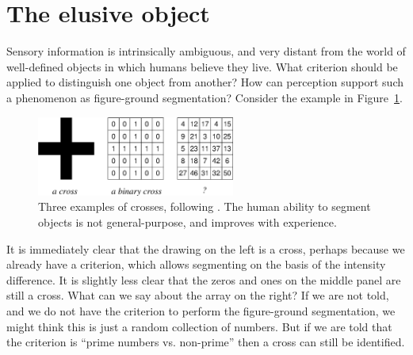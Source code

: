 






\section{The elusive object}

Sensory information is intrinsically ambiguous, and very distant from
the world of well-defined objects in which humans believe they live.
What criterion should be applied to distinguish one object from
another?  How can perception support such a phenomenon as
figure-ground segmentation?  Consider the example in
Figure~\ref{fig:number-cross}.
%
\begin{figure}[tbh]
\begin{center}
\includegraphics[width=6.5cm]{number-cross.eps}
\caption{ 
\label{fig:number-cross}
%
Three examples of crosses, following \cite{manzotti01coscienza}.  The
human ability to segment objects is not general-purpose, and improves
with experience.
%
}
\end{center}
\end{figure}
%
It is immediately clear that the drawing on the left is a cross,
perhaps because we already have a criterion, which allows segmenting
on the basis of the intensity difference. It is slightly less clear
that the zeros and ones on the middle panel are still a cross. What
can we say about the array on the right?  If we are not told, and we
do not have the criterion to perform the figure-ground segmentation,
we might think this is just a random collection of numbers. But if we
are told that the criterion is ``prime numbers vs. non-prime'' then a
cross can still be identified.

